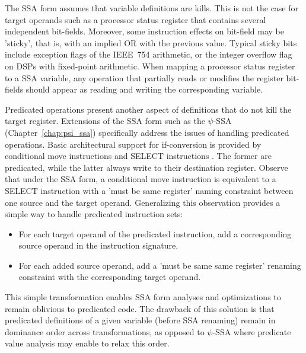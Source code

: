 The SSA form assumes that variable definitions are kills. This is not the case
for target operands such as a processor status register that contains several
independent bit-fields. Moreover, some instruction effects on bit-field may be
'sticky', that is, with an implied OR with the previous value. Typical sticky
bits include exception flags of the IEEE~754 arithmetic, or the integer overflow
flag on DSPs with fixed-point arithmetic. When mapping a processor status
register to a SSA variable, any operation that partially reads or modifies the
register bit-fields should appear as reading and writing the corresponding
variable.

Predicated operations present another aspect of definitions that do not kill
the target register. Extensions of the SSA form such as the $\psi$-SSA
(Chapter~\ref{chap:psi_ssa}) specifically address the issues of handling
predicated operations. Basic architectural support for if-conversion is
provided by conditional move instructions and SELECT instructions
\cite{Mahlke:1995:ISCA}.  The former are predicated, while the latter always
write to their destination register. Observe that under the SSA form, a
conditional move instruction is equivalent to a SELECT instruction with a 'must
be same register' naming constraint between one source and the target operand.
Generalizing this observation provides a simple way to handle predicated
instruction sets: \begin{itemize}
\item For each target operand of the predicated instruction, add a corresponding
source operand in the instruction signature.
\item For each added source operand, add a 'must be same same register' renaming
constraint with the corresponding target operand.
\end{itemize}
This simple transformation enables SSA form analyses and optimizations to remain
oblivious to predicated code. The drawback of this solution is that predicated
definitions of a given variable (before SSA renaming) remain in dominance order
across transformations, as opposed to $\psi$-SSA where predicate value analysis
may enable to relax this order.

%


